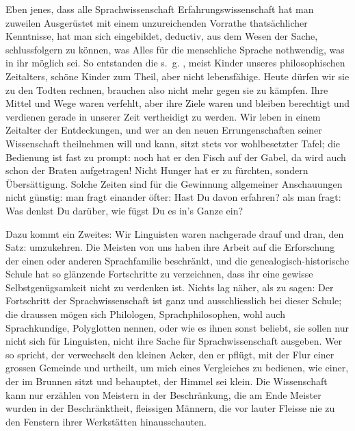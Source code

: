 Eben jenes, dass alle Sprachwissenschaft Erfahrungswissenschaft  hat man zuweilen  Ausgerüstet mit einem unzureichenden Vorrathe thatsächlicher Kenntnisse, hat man sich eingebildet, deductiv, aus dem Wesen der Sache, schlussfolgern zu können, was Alles für die menschliche Sprache nothwendig, was in ihr möglich sei. So entstanden die s.~g. \label{sp.11}, meist Kinder unseres philosophischen Zeitalters, schöne Kinder zum Theil, aber nicht lebensfähige. Heute dürfen wir sie zu den Todten rechnen, brauchen also nicht mehr gegen sie zu kämpfen. Ihre Mittel und Wege waren verfehlt, aber ihre Ziele waren und bleiben berechtigt und verdienen gerade in unserer Zeit vertheidigt zu werden. Wir leben in einem Zeitalter der Entdeckungen, und wer an den neuen Errungenschaften seiner Wissenschaft theilnehmen will und kann, sitzt stets vor wohlbesetzter Tafel; die Bedienung ist fast zu prompt: noch hat er den Fisch auf der \label{fp.12} Gabel, da wird auch schon der Braten aufgetragen! Nicht Hunger hat er zu fürchten, sondern Übersättigung. Solche Zeiten sind für die Gewinnung allgemeiner Anschauungen nicht günstig: man fragt einander öfter: Hast Du davon erfahren? als man fragt: Was denkst Du darüber, wie fügst Du es in’s Ganze ein?

Dazu kommt ein Zweites: Wir Linguisten waren nachgerade drauf und dran, den Satz:  umzukehren. Die Meisten von uns haben ihre Arbeit auf die Erforschung der einen oder anderen Sprachfamilie beschränkt, und die genealogisch-historische Schule hat so glänzende Fortschritte zu verzeichnen, dass ihr eine gewisse Selbstgenügsamkeit nicht zu verdenken ist. Nichts lag näher, als zu sagen: Der Fortschritt der Sprachwissenschaft ist ganz und ausschliesslich bei dieser Schule; die draussen mögen sich Philologen, Sprachphilosophen, wohl auch Sprachkundige, Polyglotten nennen, oder wie es ihnen sonst beliebt, sie sollen nur nicht sich für Linguisten, nicht ihre Sache für Sprachwissenschaft ausgeben. Wer so spricht, der verwechselt den kleinen Acker, den er pflügt, mit der Flur einer grossen Gemeinde und urtheilt, um mich eines  Vergleiches zu bedienen, wie einer, der im Brunnen sitzt und behauptet, der Himmel sei klein. Die Wissenschaft kann nur  erzählen von Meistern in der Beschränkung, die am Ende Meister wurden in der Beschränktheit, fleissigen Männern, die vor lauter Fleisse nie zu den Fenstern ihrer Werkstätten hinausschauten.

